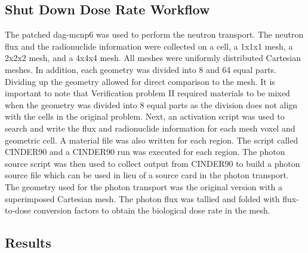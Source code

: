 \subsection{Shut Down Dose Rate Workflow}
The patched \gls{dag}-\gls{mcnp}6 was used to
perform the neutron transport. The neutron flux and the radionuclide information
were collected on a cell, a 1x1x1 mesh, a 2x2x2 mesh, and a 4x4x4 mesh. All
meshes were uniformly distributed Cartesian meshes. In addition, each geometry
was divided into 8 and 64 equal parts. Dividing up the geometry allowed for direct
comparison to the mesh. It is important to note that Verification problem II
required materials to be mixed when the geometry was divided into 8 equal parts as
the division does not align with the cells in the original problem.
Next, an activation script was used to search and write the flux and radionuclide
information for each mesh voxel and geometric cell. A material file was also
written for each region. The script called CINDER90 and a CINDER90 run was
executed for each region.
The photon source script was then used to collect output from CINDER90 to
build a photon source file which can be used in lieu of a source card in the
photon transport. The geometry used for the photon transport was the original
version with a superimposed Cartesian mesh. The photon flux was tallied and
folded with flux-to-dose conversion factors to obtain the biological dose rate
in the mesh.
%
\subsection{Results}
